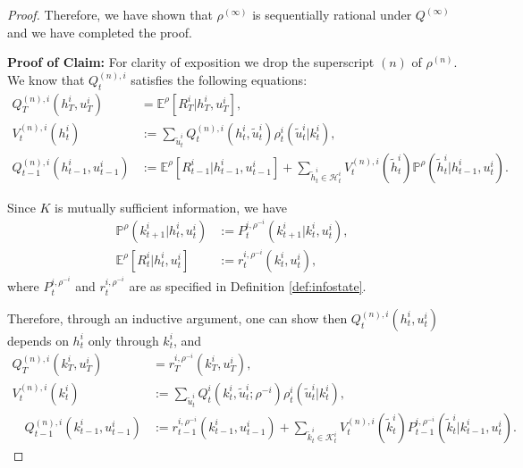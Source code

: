 \documentclass[pdflatex,sn-basic]{sn-jnl}
\newcommand{\E}{\mathbb{E}}
\renewcommand{\Pr}{\mathbb{P}}
\newcommand{\Qfunc}{Q}
\newcommand{\Comp}{K}
\newcommand{\comp}{k}
\newcommand{\Compset}{\mathcal{K}}
\theoremstyle{thmstyleone}%
\theoremstyle{thmstyletwo}%
\theoremstyle{thmstylethree}%
\begin{document}
\begin{appendices}
\begin{proof}
	Therefore, we have shown that $\rho^{(\infty)}$ is sequentially rational under $\Qfunc^{(\infty)}$ and we have completed the proof.
	
	\textbf{Proof of Claim:} For clarity of exposition we drop the superscript $(n)$ of $\rho^{(n)}$. We know that $\Qfunc_t^{(n), i}$ satisfies the following equations: %
    \begin{subequations}
	\begin{align}
		\Qfunc_{T}^{(n), i}(h_T^i, u_T^i)&=\E^{\rho}[R_T^i|h_T^i, u_T^i], \\
		V_t^{(n), i}(h_t^i)&:=\sum_{\tilde{u}_t^i}  \Qfunc_t^{(n), i}(h_t^i, \tilde{u}_t^i) \rho^{ i}_t(\tilde{u}_t^i|\comp_t^i),\\
		\Qfunc_{t-1}^{(n), i}(h_{t-1}^i, u_{t-1}^i)&:=
		\E^{\rho}[R_{t-1}^i|h_{t-1}^i, u_{t-1}^i] + \sum_{\tilde{h}_{t}^i\in\mathcal{H}_{t}^i } V_{t}^{(n), i}(\tilde{h}_t^i) \Pr^{\rho}(\tilde{h}_{t}^i|h_{t-1}^i, u_t^i).
	\end{align}
    \end{subequations}
	
	Since $\Comp$ is mutually sufficient information, we have
	\begin{align}
		\Pr^{\rho}(\comp_{t+1}^i|h_t^i, u_t^i) &:= P_t^{i, \rho^{-i}}(\comp_{t+1}^i|\comp_t^i, u_t^i),\\
		\E^{\rho}[R_t^i|h_t^i, u_t^i] &:= r_t^{i, \rho^{-i}}(\comp_t^i, u_t^i),
	\end{align}
	where $P_t^{i, \rho^{-i}}$ and $r_t^{i, \rho^{-i}}$ are as specified in Definition \ref{def:infostate}.
	
	Therefore, through an inductive argument, one can show then $\Qfunc_t^{(n), i}(h_t^i, u_t^i)$ depends on $h_t^i$ only through $\comp_t^i$, and
	\begin{subequations}\label{defofKinSE}
		\begin{align}
			\Qfunc_{T}^{(n), i}(\comp_T^i, u_T^i)&=r_{T}^{i, \rho^{-i}}(\comp_T^i, u_T^i), \label{defofKinSE:throwaway1}\\
			V_t^{(n), i}(\comp_t^i)&:=\sum_{\tilde{u}_t^i}  \Qfunc_t^{i}(\comp_t^i, \tilde{u}_t^i;\rho^{-i}) \rho^{i}_t(\tilde{u}_t^i|\comp_t^i),\label{defofKinSE:throwaway2}\\
			\quad \Qfunc_{t-1}^{(n), i}(\comp_{t-1}^i, u_{t-1}^i)&:=
			r_{t-1}^{i,\rho^{-i}}(\comp_{t-1}^i, u_{t-1}^i)+ \sum_{\tilde{\comp}_{t}^i\in\Compset_{t}^i } V_{t}^{(n), i}(\tilde{\comp}_t^i) P_{t-1}^{i,\rho^{-i}}(\tilde{\comp}_{t}^i|\comp_{t-1}^i, u_t^i).\label{defofKinSE:throwaway3}
		\end{align}
	\end{subequations}
	

\end{proof}
\end{appendices}
\end{document}
